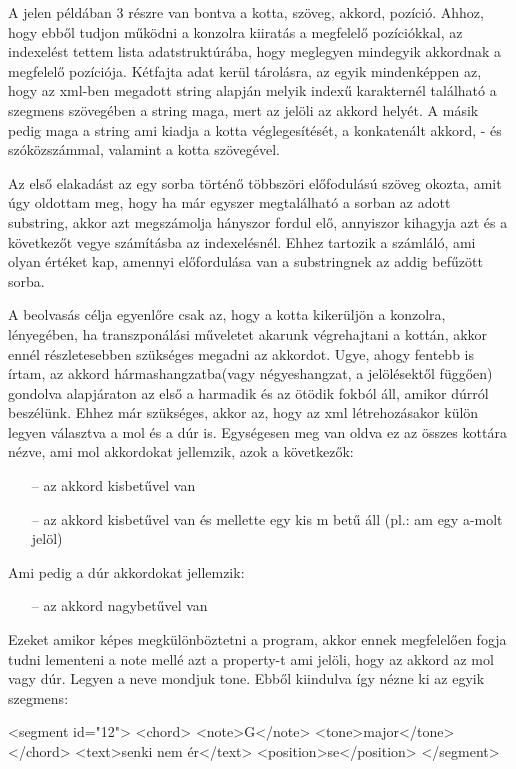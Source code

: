 A jelen példában 3 részre van bontva a kotta, szöveg, akkord, pozíció. Ahhoz, hogy ebből tudjon  működni a konzolra kiiratás a megfelelő pozíciókkal, az indexelést tettem lista adatstruktúrába, hogy meglegyen mindegyik akkordnak a megfelelő pozíciója. Kétfajta adat kerül tárolásra, az egyik mindenképpen az, hogy az xml-ben megadott string alapján melyik indexű karakternél található a szegmens szövegében a string maga, mert az jelöli az akkord helyét. A másik pedig maga a string ami kiadja a kotta véglegesítését, a konkatenált akkord, - és szóközszámmal, valamint a kotta szövegével.

Az első elakadást az egy sorba történő többszöri előfodulású szöveg okozta, amit úgy oldottam meg, hogy ha már egyszer megtalálható a sorban az adott substring, akkor azt megszámolja hányszor fordul elő, annyiszor kihagyja azt és a következőt vegye számításba az indexelésnél. Ehhez tartozik a számláló, ami olyan értéket kap, amennyi előfordulása van a substringnek az addig befűzött sorba.

A beolvasás célja egyenlőre csak az, hogy a kotta kikerüljön a konzolra, lényegében, ha transzponálási műveletet akarunk végrehajtani a kottán, akkor ennél részletesebben szükséges megadni az akkordot. Ugye, ahogy fentebb is írtam, az akkord hármashangzatba(vagy négyeshangzat, a jelölésektől függően) gondolva alapjáraton az első a harmadik és az ötödik fokból áll, amikor dúrról beszélünk. Ehhez már szükséges, akkor az, hogy az xml létrehozásakor külön legyen választva a mol és a dúr is. Egységesen meg van oldva ez az összes kottára nézve, ami mol akkordokat jellemzik, azok a következők:
\begin{itemize}
	\item[--]az akkord kisbetűvel van
	\item[--]az akkord kisbetűvel van és mellette egy kis m betű áll (pl.: am egy a-molt jelöl)\linebreak
\end{itemize}
Ami pedig a dúr akkordokat jellemzik:
\begin{itemize}
	\item[--]az akkord nagybetűvel van
\end{itemize}

Ezeket amikor képes megkülönböztetni a program, akkor ennek megfelelően fogja tudni lementeni a note mellé azt a property-t ami jelöli, hogy az akkord az mol vagy dúr. Legyen a neve mondjuk tone. Ebből kiindulva így nézne ki az egyik szegmens:
\begin{xml}
<segment id="12">
   <chord>
      <note>G</note>
      <tone>major</tone>
   </chord>
   <text>senki nem ér</text>
   <position>se</position>
</segment>
\end{xml}

